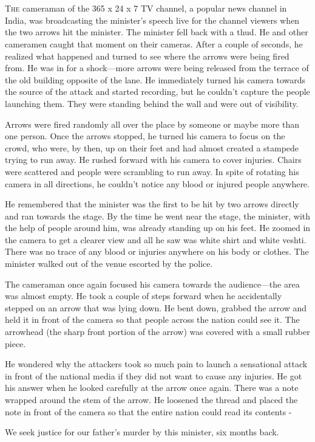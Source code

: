 \chapter{}

\lettrine{T}{he} cameraman of the 365 x 24 x 7 TV channel, a popular news channel in India,
was broadcasting the minister's speech live for the channel viewers when the two
arrows hit the minister. The minister fell back with a thud. He and other
cameramen caught that moment on their cameras. After a couple of seconds, he
realized what happened and turned to see where the arrows were being fired from.
He was in for a shock—more arrows were being released from the terrace of the
old building opposite of the lane. He immediately turned his camera towards the
source of the attack and started recording, but he couldn't capture the people
launching them. They were standing behind the wall and were out of visibility.

Arrows were fired randomly all over the place by someone or maybe more than one
person. Once the arrows stopped, he turned his camera to focus on the crowd, who
were, by then, up on their feet and had almost created a stampede trying to run
away. He rushed forward with his camera to cover injuries. Chairs were scattered
and people were scrambling to run away. In spite of rotating his camera in all
directions, he couldn't notice any blood or injured people anywhere.

He remembered that the minister was the first to be hit by two arrows directly
and ran towards the stage. By the time he went near the stage, the minister,
with the help of people around him, was already standing up on his feet. He
zoomed in the camera to get a clearer view and all he saw was white shirt and
white veshti. There was no trace of any blood or injuries anywhere on his body
or clothes. The minister walked out of the venue escorted by the police.

The cameraman once again focused his camera towards the audience—the area was
almost empty. He took a couple of steps forward when he accidentally stepped on
an arrow that was lying down. He bent down, grabbed the arrow and held it in
front of the camera so that people across the nation could see it. The arrowhead
(the sharp front portion of the arrow) was covered with a small rubber piece.

He wondered why the attackers took so much pain to launch a sensational attack
in front of the national media if they did not want to cause any injuries. He
got his answer when he looked carefully at the arrow once again. There was a
note wrapped around the stem of the arrow. He loosened the thread and placed the
note in front of the camera so that the entire nation could read its contents -

We seek justice for our father's murder by this minister, six months back.